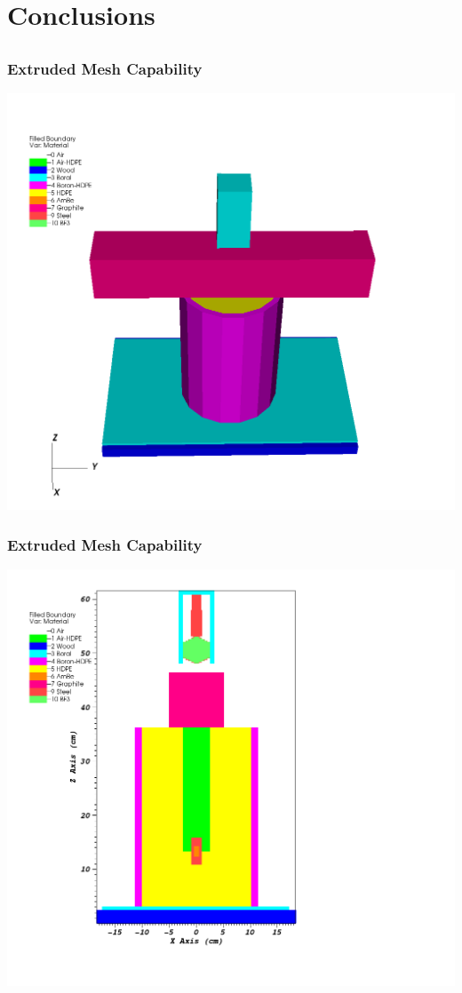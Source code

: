 \documentclass[]{beamer}
\begin{document}
\section{Conclusions}
\subsection{}

\begin{frame}[t]\frametitle{Extruded Mesh Capability}
\centering
\includegraphics[scale=0.2]{figures/IM1_3D.png}
\end{frame}

\begin{frame}[t]\frametitle{Extruded Mesh Capability}
\centering
\includegraphics[scale=0.23]{figures/IM1_Adams_2D_slice}
\end{frame}
\end{document}
